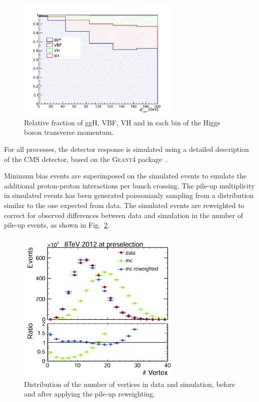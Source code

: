 \begin{figure}[htb]
\centering
\includegraphics[width=0.7\textwidth]{images/signal_composition_ttH.pdf}
\caption{Relative fraction of ggH, VBF, VH and \ttH in each bin of the Higgs boson transverse momentum.}\label{fig:signal_comp}
\end{figure}

For all processes, the detector response is simulated using a detailed description of the CMS detector, based on the \textsc{Geant4} package~\cite{Agostinelli:2002hh}.

Minimum bias events are superimposed on the simulated events to emulate the additional 
proton-proton interactions per bunch crossing. The pile-up multiplicity in simulated events has been generated poissonianly sampling from a distribution similar to the one expected from data.
The simulated events are reweighted to correct for observed differences between data and simulation in the number of pile-up events, as shown in Fig.~\ref{fig:nvertices}.

\begin{figure}[htb]
\centering
\includegraphics[width=0.7\textwidth]{images/nvertex.pdf}
\caption{Distribution of the number of vertices in data and simulation, before and after applying the pile-up reweighting.}\label{fig:nvertices}
\end{figure}

